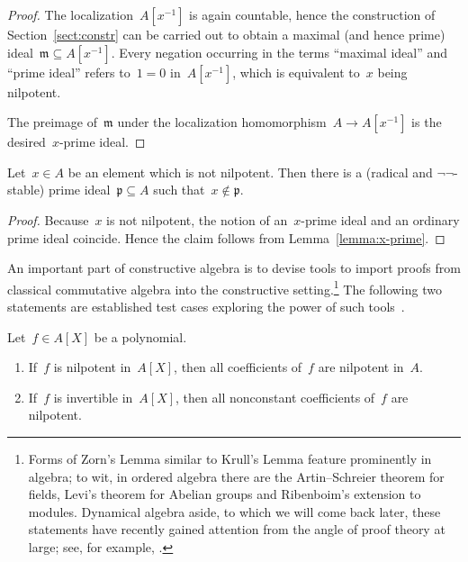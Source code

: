 \documentclass[envcountsect,envcountsame,runningheads]{llncs}
\newcommand{\mmm}{\mathfrak{m}}
\newcommand{\ppp}{\mathfrak{p}}
\renewcommand{\_}{\mathpunct{.}\,}
\begin{document}
\begin{proof}The localization~$A[x^{-1}]$ is again countable, hence the
construction of Section~\ref{sect:constr} can be carried out to obtain a
maximal (and hence prime) ideal~$\mmm \subseteq A[x^{-1}]$. Every negation
occurring in the terms ``maximal ideal'' and ``prime ideal'' refers to~$1 = 0$
in~$A[x^{-1}]$, which is equivalent to~$x$ being nilpotent.

The preimage of~$\mmm$ under the localization homomorphism~$A \to A[x^{-1}]$ is
the desired~$x$-prime ideal.
\end{proof}

\begin{corollary}\label{cor:nilp-prime}Let~$x \in A$ be an element which is not nilpotent. Then there is a
(radical and $\neg\neg$-stable) prime ideal~$\ppp \subseteq A$ such that~$x \not\in \ppp$.
\end{corollary}

\begin{proof}Because~$x$ is not nilpotent, the notion of an~$x$-prime ideal and
an ordinary prime ideal coincide. Hence the claim follows from
Lemma~\ref{lemma:x-prime}.\end{proof}

An important part of constructive algebra is to devise tools to import
proofs from classical commutative algebra into the constructive
setting.\footnote{Forms of Zorn's Lemma similar to Krull's Lemma
feature prominently in algebra; to wit, in ordered algebra there are the
Artin--Schreier theorem for fields, Levi's theorem for Abelian groups and
Ribenboim's extension to modules. Dynamical algebra aside, to which we will
come back later, these statements have recently gained attention from the angle
of proof theory at large; see, for example,
\cite{rin:ukl,rin:edde,rin:edde:full,wessel:ordering,schuster-wessel:ext,wessel:conred,bon:rib,pow:occ}.}
The following two statements are established test cases exploring the power of
such tools~\cite{schuster:induction,schuster:inductionjournal,persson:constructive-spectrum,powell-schuster-wiesnet:krull,swy:dynprime,schuster-wessel:indeterminacy,banaschweski-vermeulen:radical,richman:trivial-rings,coquand-lombardi:logical,coquand-lombardi-roy:dynamicalmethod}.

\begin{proposition}\label{prop:test-cases}Let~$f \in A[X]$ be a polynomial.
\begin{enumerate}
\item If~$f$ is nilpotent in~$A[X]$, then all coefficients of~$f$ are nilpotent in~$A$.
\item If~$f$ is invertible in~$A[X]$, then all nonconstant coefficients of~$f$ are nilpotent.
\end{enumerate}
\end{proposition}
\end{document}
